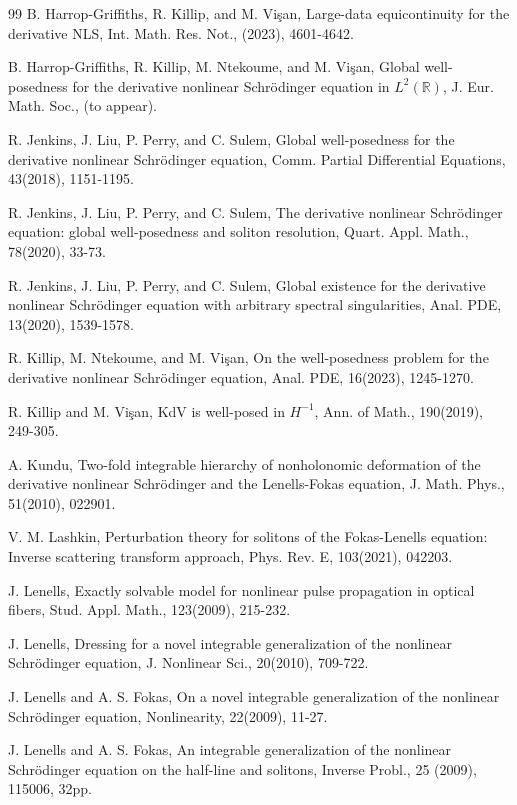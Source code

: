 \documentclass[preprint,compress,12pt]{elsarticle}
\numberwithin{equation}{section}
\begin{document}
\begin{thebibliography}{99}
B. Harrop-Griffiths, R. Killip, and M. Vi\c{s}an, Large-data equicontinuity for the derivative NLS, Int. Math. Res. Not., (2023), 4601-4642.

B. Harrop-Griffiths, R. Killip, M. Ntekoume, and M. Vi\c{s}an, Global well-posedness for the derivative nonlinear Schr\"{o}dinger equation in $L^{2}(\mathbb{R})$, J. Eur. Math. Soc., (to appear).

R. Jenkins, J. Liu, P. Perry, and C. Sulem, Global well-posedness for the derivative nonlinear Schr\"{o}dinger equation, Comm. Partial Differential Equations, 43(2018), 1151-1195.

R. Jenkins, J. Liu, P. Perry, and C. Sulem, The derivative nonlinear Schr\"{o}dinger equation: global well-posedness and soliton resolution, Quart. Appl. Math., 78(2020), 33-73.

R. Jenkins, J. Liu, P. Perry, and C. Sulem, Global existence for the derivative nonlinear Schr\"{o}dinger equation with arbitrary spectral singularities, Anal. PDE, 13(2020), 1539-1578.

R. Killip, M. Ntekoume, and M. Vi\c{s}an, On the well-posedness problem for the derivative nonlinear Schr\"{o}dinger equation, Anal. PDE, 16(2023), 1245-1270.

R. Killip and M. Vi\c{s}an, KdV is well-posed in $H^{-1}$, Ann. of Math., 190(2019), 249-305.

A. Kundu, Two-fold integrable hierarchy of nonholonomic deformation of the derivative nonlinear Schr\"{o}dinger and the Lenells-Fokas equation, J. Math. Phys., 51(2010), 022901.

V. M. Lashkin, Perturbation theory for solitons of the Fokas-Lenells equation: Inverse scattering transform approach, Phys. Rev. E, 103(2021), 042203.

J. Lenells, Exactly solvable model for nonlinear pulse propagation in optical fibers, Stud. Appl. Math., 123(2009), 215-232.

J. Lenells, Dressing for a novel integrable generalization of the nonlinear Schr\"{o}dinger equation, J. Nonlinear Sci., 20(2010), 709-722.

J. Lenells and A. S. Fokas, On a novel integrable generalization of the nonlinear Schr\"{o}dinger equation, Nonlinearity, 22(2009), 11-27.

J. Lenells and A. S. Fokas, An integrable generalization of the nonlinear Schr\"{o}dinger equation on the half-line and solitons, Inverse Probl., 25 (2009), 115006, 32pp.


\end{thebibliography}
\end{document}
